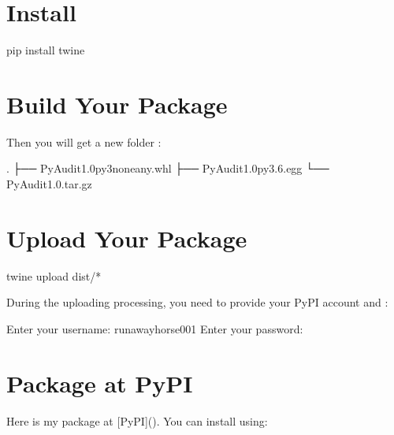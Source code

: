 \documentclass[letterpaper,12pt,english]{sphinxmanual}
\begin{document}
\section{Install }
\label{\detokenize{pypi:install-twine}}
\begin{sphinxVerbatim}[commandchars=\\\{\}]
pip install twine
\end{sphinxVerbatim}


\section{Build Your Package}
\label{\detokenize{pypi:build-your-package}}
\begin{sphinxVerbatim}[commandchars=\\\{\}]
   
\end{sphinxVerbatim}

Then you will get a new folder :

\begin{sphinxVerbatim}[commandchars=\\\{\}]
.
├── PyAudit\PYGZhy{}1.0\PYGZhy{}py3\PYGZhy{}none\PYGZhy{}any.whl
├── PyAudit\PYGZhy{}1.0\PYGZhy{}py3.6.egg
└── PyAudit\PYGZhy{}1.0.tar.gz
\end{sphinxVerbatim}


\section{Upload Your Package}
\label{\detokenize{pypi:upload-your-package}}
\begin{sphinxVerbatim}[commandchars=\\\{\}]
twine upload dist/*
\end{sphinxVerbatim}

During the uploading processing, you need to provide your PyPI account  and :

\begin{sphinxVerbatim}[commandchars=\\\{\}]
Enter your username: runawayhorse001
Enter your password:
\end{sphinxVerbatim}


\section{Package at PyPI}
\label{\detokenize{pypi:package-at-pypi}}
Here is my  package at {[}PyPI{]}(). You can install  using:
\end{document}
